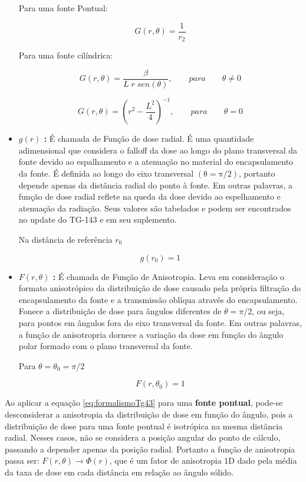 \documentclass[11pt,a4paper]{article}
\begin{document}
\begin{itemize}
					Para uma fonte Pontual:

					\begin{equation}
						G(r, \theta) = \frac{1}{r_2}
					\end{equation}

					Para uma fonte cilíndrica:

					\begin{equation}
						G(r, \theta) = \frac{\beta}{L \; r \; sen(\theta)}, \qquad para \qquad \theta \neq 0
					\end{equation}

					\begin{equation}
						G(r, \theta) = \left(r^2 - \frac{L^2}{4}\right)^{-1}, \qquad para \qquad \theta = 0
					\end{equation}
				
				\item \textbf{\textcolor{CarnationPink}{$g(r)$} : } É chamada de Função de dose radial. É uma quantidade adimensional que considera o falloff da dose ao longo do plano transversal da fonte devido ao espalhamento e a atenuação no material do encapsulamento da fonte. É definida ao longo do eixo transversal $\mathrm{(\theta = \pi / 2)}$, portanto depende apenas da distância radial do ponto à fonte. Em outras palavras, a função de dose radial reflete na queda da dose devido ao espelhamento e atenuação da radiação. Seus valores são tabelados e podem ser encontrados no update do TG-143 e em seu suplemento.
				
					Na distância de referência $r_0$

					$$g(r_0) = 1$$
				
				\item \textbf{\textcolor{CarnationPink}{$F(r, \theta)$} : } É chamada de Função de Anisotropia. Leva em consideração o formato anisotrópico da distribuição de dose causado pela própria filtração do encapsulamento da fonte e a transmissão oblíqua através do encapsulamento. Fonece a distribuição de dose para ângulos diferentes de $\theta = \pi / 2$, ou seja, para pontos em ângulos fora do eixo transversal da fonte. Em outras palavras, a função de anisotropria dornece a variação da dose em função do ângulo polar formado com o plano transversal da fonte.
				
					Para $\theta = \theta_0 = \pi/2$

					$$F(r, \theta_0) = 1$$

			\end{itemize}
			
			Ao aplicar a equação \ref{eq:formalismoTg43} para uma \textbf{\textcolor{CarnationPink}{fonte pontual}}, pode-se desconsiderar a anisotropia da distribuição de dose em função do ângulo,  pois a distribuição de dose para uma fonte pontual é isotrópica na mesma distância radial. Nesses casos, não se considera a posição angular do ponto de cálculo, passando a depender apenas da posição radial. Portanto a função de anisotropia passa ser: $F(r, \theta) \rightarrow \Phi (r)$,  que é um fator de anisotropia 1D dado pela média da taxa de dose em cada distância em relação ao ângulo sólido.
			
\end{document}
